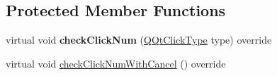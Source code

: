 \subsection*{Protected Member Functions}
\begin{DoxyCompactItemize}
\item 
\mbox{\label{class_q_qt_double_click_helper_a3baa11d7bfb12cd84d3b821d78e9b778}} 
virtual void {\bfseries check\+Click\+Num} (\mbox{\hyperlink{class_q_qt_virtual_click_helper_ace6c0c9b072e51f2cb3ff1316404b764}{Q\+Qt\+Click\+Type}} type) override
\item 
virtual void \mbox{\hyperlink{class_q_qt_double_click_helper_a42ab28dcfaf01d7e8bf8bb01bd5ca311}{check\+Click\+Num\+With\+Cancel}} () override
\end{DoxyCompactItemize}
